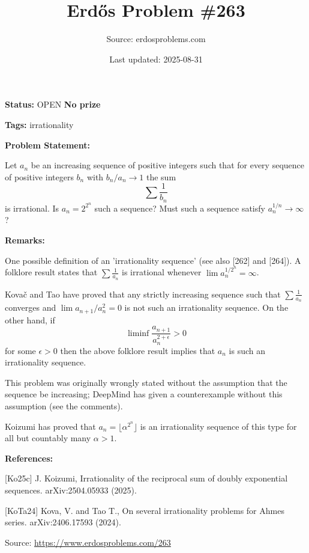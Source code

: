 \documentclass{article}
\title{Erd\H{o}s Problem \#263}
\date{Last updated: 2025-08-31}
\author{Source: erdosproblems.com}
\begin{document}
\maketitle

\noindent\textbf{Status:} OPEN \quad \textbf{No prize}

\noindent\textbf{Tags:} irrationality

\medskip
\noindent\textbf{Problem Statement:}

Let $a_n$ be an increasing sequence of positive integers such that for every sequence of positive integers $b_n$ with $b_n/a_n\to 1$ the sum\[\sum\frac{1}{b_n}\]is irrational. Is $a_n=2^{2^n}$ such a sequence? Must such a sequence satisfy $a_n^{1/n}\to \infty$?

\bigskip
\noindent\textbf{Remarks:}

One possible definition of an 'irrationality sequence' (see also [262] and [264]). A folklore result states that $\sum \frac{1}{a_n}$ is irrational whenever $\lim a_n^{1/2^n}=\infty$.

Kova\v{c} and Tao \cite{KoTa24} have proved that any strictly increasing sequence such that $\sum \frac{1}{a_n}$ converges and $\lim a_{n+1}/a_n^2=0$ is not such an irrationality sequence. On the other hand, if\[\liminf \frac{a_{n+1}}{a_n^{2+\epsilon}}>0\]for some $\epsilon>0$ then the above folklore result implies that $a_n$ is such an irrationality sequence.

This problem was originally wrongly stated without the assumption that the sequence be increasing; DeepMind has given a counterexample without this assumption (see the comments).

Koizumi \cite{Ko25c} has proved that $a_n=\lfloor \alpha^{2^n}\rfloor$ is an irrationality sequence of this type for all but countably many $\alpha>1$.

\bigskip
\noindent\textbf{References:}

[Ko25c] J. Koizumi, Irrationality of the reciprocal sum of doubly exponential sequences. arXiv:2504.05933 (2025).
 
 [KoTa24] Kova\vC, V. and Tao T., On several irrationality problems for Ahmes series. arXiv:2406.17593 (2024).

\bigskip
\noindent\small{Source: \url{https://www.erdosproblems.com/263}}
\end{document}
